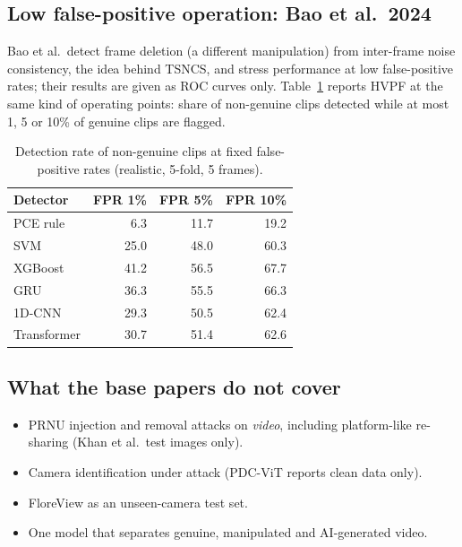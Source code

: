 \documentclass[11pt,a4paper]{article}
\begin{document}
\subsection{Low false-positive operation: Bao et al.~2024}
Bao et al.\ detect frame deletion (a different manipulation) from inter-frame noise consistency, the idea behind TSNCS, and stress performance at low false-positive rates; their results are given as ROC curves only. Table~\ref{tab:lowfpr} reports HVPF at the same kind of operating points: share of non-genuine clips detected while at most 1, 5 or 10\% of genuine clips are flagged.
\begin{table}[H]\centering\small\caption{Detection rate of non-genuine clips at fixed false-positive rates (realistic, 5-fold, 5 frames).}\label{tab:lowfpr}\begin{tabular}{lrrr}\toprule Detector & FPR 1\% & FPR 5\% & FPR 10\% \\\midrule
PCE rule & 6.3 & 11.7 & 19.2 \\
SVM & 25.0 & 48.0 & 60.3 \\
XGBoost & 41.2 & 56.5 & 67.7 \\
GRU & 36.3 & 55.5 & 66.3 \\
1D-CNN & 29.3 & 50.5 & 62.4 \\
Transformer & 30.7 & 51.4 & 62.6 \\
\bottomrule\end{tabular}\end{table}
\subsection{What the base papers do not cover}\begin{itemize}
\item PRNU injection and removal attacks on \emph{video}, including platform-like re-sharing (Khan et al.\ test images only).
\item Camera identification under attack (PDC-ViT reports clean data only).
\item FloreView as an unseen-camera test set.
\item One model that separates genuine, manipulated and AI-generated video.
\end{itemize}
\end{document}

